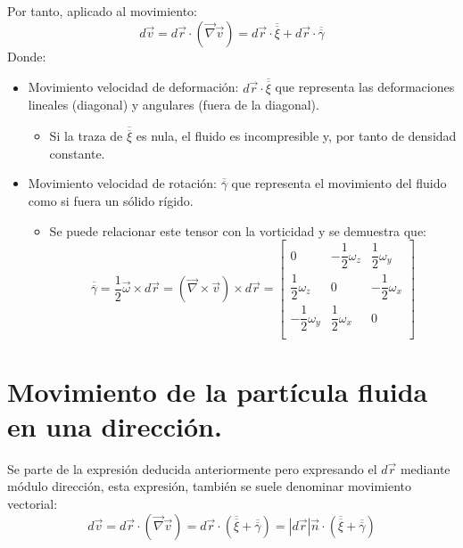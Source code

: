 Por tanto, aplicado al movimiento:
\[d\vec{v}=d\vec{r}\cdot(\vec{\nabla}\vec{v})=d\vec{r}\cdot\overline{\overline{\xi}}+d\vec{r}\cdot\overline{\overline{\gamma}}\]
Donde:
\begin{itemize}
	\item Movimiento velocidad de deformación: $d\vec{r}\cdot\overline{\overline{\xi}}$ que representa las deformaciones lineales (diagonal) y angulares (fuera de la diagonal).
	\begin{itemize}
		\item Si la traza de $\overline{\overline{\xi}}$ es nula, el fluido es incompresible y, por tanto de densidad constante.
	\end{itemize}
	\item Movimiento velocidad de rotación: $\overline{\overline{\gamma}}$ que representa el movimiento del fluido como si fuera un sólido rígido.
	\begin{itemize}
		\item Se puede relacionar este tensor con la vorticidad y se demuestra que:
		\[\overline{\overline{\gamma}} =\dfrac{1}{2}\vec{\omega}\times d \vec{r}=\left(\vec{\nabla}\times\vec{v}\right)\times d \vec{r}=\begin{bmatrix}
			0 & -\dfrac{1}{2}\omega_z & \dfrac{1}{2}\omega_y \\
			\dfrac{1}{2}\omega_z & 0 & -\dfrac{1}{2}\omega_x\\	
			-\dfrac{1}{2}\omega_y & \dfrac{1}{2}\omega_x & 0 \\
		\end{bmatrix}\]
	\end{itemize}
\end{itemize}
\section{Movimiento de la partícula fluida en una dirección.}
Se parte de la expresión deducida anteriormente pero expresando el $d\vec{r}$ mediante módulo dirección, esta expresión, también se suele denominar movimiento vectorial:
\[d\vec{v}=d\vec{r}\cdot\left(\vec{\nabla}\vec{v}\right)=d\vec{r}\cdot\left(\overline{\overline{\xi}}+\overline{\overline{\gamma}}\right)=|d\vec{r}|\vec{n}\cdot\left(\overline{\overline{\xi}}+\overline{\overline{\gamma}}\right)\]

